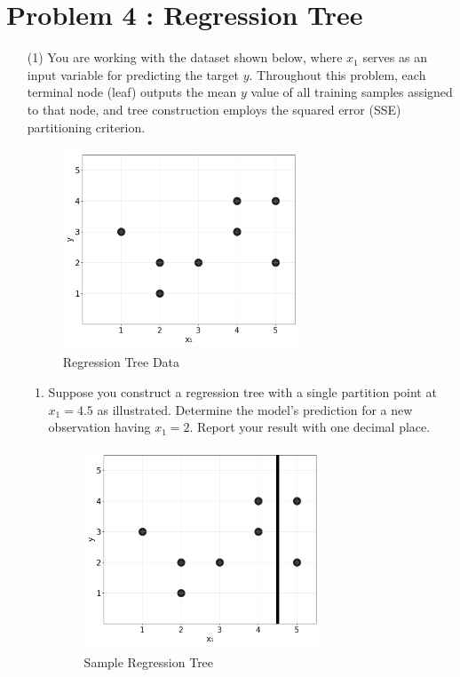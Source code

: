 \documentclass[11pt,addpoints,answers]{exam}
\newcounter{subq}        %
\renewcommand{\thesubq}{(\alph{subq})}  %
\newenvironment{subquestions}{
	\setcounter{subq}{0}%
	\begin{enumerate}[
		label=\thesubq,
		leftmargin=*,
		align=left,
		itemsep=6pt
		]
	}{
	\end{enumerate}
}
\newcommand{\subquestion}{\refstepcounter{subq}\item}  %
\begin{document}
	
	\section*{Problem 4 : Regression Tree}
	\begin{enumerate}[label=\alph*), itemsep=10pt]
		\item[(1)] You are working with the dataset shown below, where $x_1$ serves as an input variable for predicting the target $y$. Throughout this problem, each terminal node (leaf) outputs the mean $y$ value of all training samples assigned to that node, and tree construction employs the squared error (SSE) partitioning criterion.
		
		\begin{figure}[H]
			\centering
			\includegraphics[width=7cm,height=6cm]{images/regression_tree_data.png}
			\caption{Regression Tree Data} \label{fig:reg5_data}  %
		\end{figure}
		
		\begin{subquestions}
			\subquestion Suppose you construct a regression tree with a single partition point at $x_1=4.5$ as illustrated. Determine the model's prediction for a new observation having $x_1 = 2$. Report your result with one decimal place.
			
			\begin{figure}[H]
				\centering
				\includegraphics[width=7cm,height=6cm]{images/regression_tree_choices.png}
				\caption{Sample Regression Tree} \label{fig:reg5_sample}  %
			\end{figure}
			

\end{subquestions}
\end{enumerate}
\end{document}
